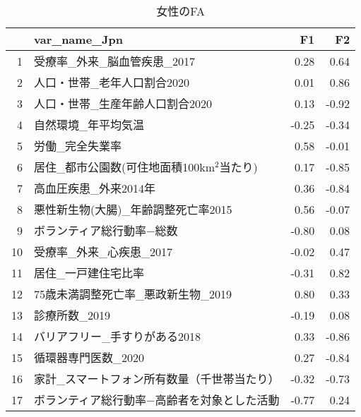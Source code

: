 \begin{table}[ht]
\centering
\caption{女性のFA} 
\label{FAf}
\begingroup\tiny
\begin{tabular}{rlrr}
  \hline
 & var\_name\_Jpn & F1 & F2 \\ 
  \hline
1 & 受療率\_外来\_脳血管疾患\_2017 & 0.28 & 0.64 \\ 
  2 & 人口・世帯\_老年人口割合2020 & 0.01 & 0.86 \\ 
  3 & 人口・世帯\_生産年齢人口割合2020 & 0.13 & -0.92 \\ 
  4 & 自然環境\_年平均気温 & -0.25 & -0.34 \\ 
  5 & 労働\_完全失業率 & 0.58 & -0.01 \\ 
  6 & 居住\_都市公園数(可住地面積100km$^2$当たり) & 0.17 & -0.85 \\ 
  7 & 高血圧疾患\_外来2014年 & 0.36 & -0.84 \\ 
  8 & 悪性新生物(大腸)\_年齢調整死亡率2015 & 0.56 & -0.07 \\ 
  9 & ボランティア総行動率−総数 & -0.80 & 0.08 \\ 
  10 & 受療率\_外来\_心疾患\_2017 & -0.02 & 0.47 \\ 
  11 & 居住\_一戸建住宅比率 & -0.31 & 0.82 \\ 
  12 & 75歳未満調整死亡率\_悪政新生物\_2019 & 0.80 & 0.33 \\ 
  13 & 診療所数\_2019 & -0.19 & 0.08 \\ 
  14 & バリアフリー\_手すりがある2018 & 0.33 & -0.86 \\ 
  15 & 循環器専門医数\_2020 & 0.27 & -0.84 \\ 
  16 & 家計\_スマートフォン所有数量（千世帯当たり） & -0.32 & -0.73 \\ 
  17 & ボランティア総行動率−高齢者を対象とした活動 & -0.77 & 0.24 \\ 
   \hline
\end{tabular}
\endgroup
\end{table}
